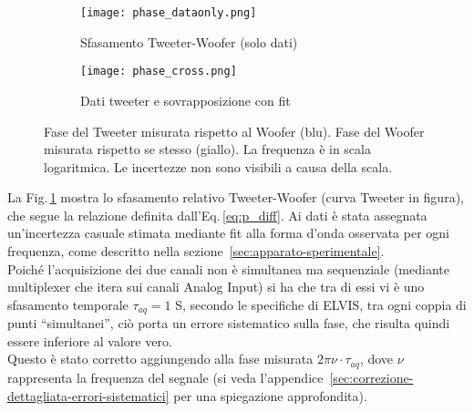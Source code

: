 \documentclass[../Relazione_circuiti]{subfiles}
\begin{document}
  \begin{figure}[H]
    \centering

    \begin{subfigure}{=0.49\textwidth}
      \centering
      \texttt{[image: phase\_dataonly.png]}
      \caption{Sfasamento Tweeter-Woofer (solo dati)}
      \label{fig:pdiff_dataonly}

    \end{subfigure}
    \hfill
    \begin{subfigure}{=0.49\textwidth}
      \centering
      \texttt{[image: phase\_cross.png]}
      \caption{Dati tweeter e sovrapposizione con fit}
      \label{fig:pdiff_fit_data}

    \end{subfigure}

    \caption{
      Fase del Tweeter misurata rispetto al Woofer (blu). Fase del Woofer misurata rispetto se stesso (giallo).
      La frequenza è in scala logaritmica. Le incertezze non sono visibili a causa della scala.
    }
    \label{fig:phase_diff}

  \end{figure}

  La Fig.\,\ref{fig:pdiff_dataonly} mostra lo sfasamento relativo Tweeter-Woofer (curva Tweeter in figura), che segue la
  relazione definita dall'Eq.\,\eqref{eq:p_diff}.
  Ai dati è stata assegnata un'incertezza casuale stimata mediante fit alla forma d'onda osservata per ogni frequenza,
  come descritto nella sezione~\ref{sec:apparato-sperimentale}. \\
  Poiché l'acquisizione dei due canali non è simultanea ma sequenziale (mediante multiplexer che itera sui canali Analog
  Input) si ha che tra di essi vi è uno sfasamento temporale $\tau_{aq}=1$ \textmu S, secondo le specifiche di ELVIS, tra
  ogni coppia di punti ``simultanei'', ciò porta un errore sistematico sulla fase, che risulta quindi essere
  inferiore al valore vero. \\
  Questo è stato corretto aggiungendo alla fase misurata $ 2 \pi \nu \cdot \tau_{aq}$, dove $\nu$
  rappresenta la frequenza del segnale (si veda l'appendice~\ref{sec:correzione-dettagliata-errori-sistematici} per una
  spiegazione approfondita).
\end{document}
